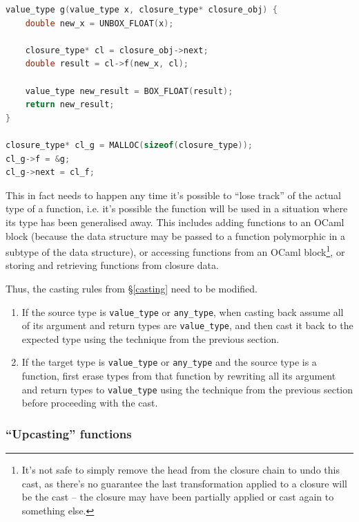 \begin{lstlisting}[language=C]
value_type g(value_type x, closure_type* closure_obj) {
    double new_x = UNBOX_FLOAT(x);

    closure_type* cl = closure_obj->next;
    double result = cl->f(new_x, cl);
    
    value_type new_result = BOX_FLOAT(result);
    return new_result;
}

closure_type* cl_g = MALLOC(sizeof(closure_type));
cl_g->f = &g;
cl_g->next = cl_f;
\end{lstlisting}

This in fact needs to happen any time it's possible to ``lose track'' of the
actual type of a function, i.e. it's possible the function will be used in a
situation where its type has been generalised away. This includes adding
functions to an OCaml block (because the data structure may be passed to a
function polymorphic in a subtype of the data structure), or accessing functions
from an OCaml block\footnote{It's not safe to simply remove the head from the
    closure chain to undo this cast, as there's no guarantee the last
transformation applied to a closure will be the cast -- the closure may have
been partially applied or cast again to something else.}, or storing and
retrieving functions from closure data.

Thus, the casting rules from \S\ref{casting} need to be modified.

\begin{enumerate}

\item If the source type is \verb|value_type| or \verb|any_type|, when casting
    back assume all of its argument and return types are \verb|value_type|, and
    then cast it back to the expected type using the technique from the previous
    section.

\item If the target type is \verb|value_type| or \verb|any_type| and the source
    type is a function, first erase types from that function by rewriting all
    its argument and return types to \verb|value_type| using the technique from
    the previous section before proceeding with the cast.

\end{enumerate}

\subsubsection{``Upcasting'' functions}

